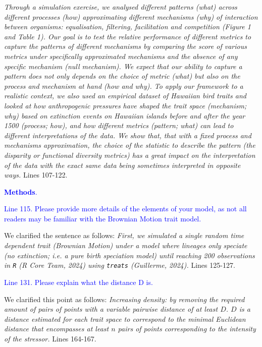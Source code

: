 \documentclass[
]{article}
\begin{document}
\textit{Through a simulation exercise, we analysed different patterns (what) across different processes (how) approximating different mechanisms (why) of interaction between organisms: equalisation, filtering, facilitation and competition (Figure 1 and Table 1).
Our goal is to test the relative performance of different metrics to capture the patterns of different mechanisms by comparing the score of various metrics under specifically approximated mechanisms and the absence of any specific mechanism (null mechanism).
We expect that our ability to capture a pattern does not only depends on the choice of metric (what) but also on the process and mechanism at hand (how and why).
To apply our framework to a realistic context, we also used an empirical dataset of Hawaiian bird traits and looked at how anthropogenic pressures have shaped the trait space (mechanism; why) based on extinction events on Hawaiian islands before and after the year 1500 (process; how), and how different metrics (pattern; what) can lead to different interpretations of the data.
We show that, that with a fixed process and mechanisms approximation, the choice of the statistic to describe the pattern (the disparity or functional diversity metrics) has a great impact on the interpretation of the data with the exact same data being sometimes interpreted in opposite ways.}
Lines 107-122.

\textcolor{blue}{\textbf{Methods}.}

\textcolor{blue}{Line 115. Please provide more details of the elements of your model, as not all readers may be familiar with the Brownian Motion trait model.}

We clarified the sentence as follows:
\textit{First, we simulated a single random time dependent trait (Brownian Motion) under a model where lineages only speciate (no extinction; i.e. a pure birth speciation model) until reaching 200 observations in \texttt{R} (R Core Team, 2024) using \texttt{treats} (Guillerme, 2024).}
Lines 125-127.

\textcolor{blue}{Line 131. Please explain what the distance D is.}

We clarified this point as follows:
\textit{Increasing density: by removing the required amount of pairs of points with a variable pairwise distance of at least $D$.
$D$ is a distance estimated for each trait space to correspond to the minimal Euclidean distance that encompasses at least $n$ pairs of points corresponding to the intensity of the stressor.}
Lines 164-167.
\end{document}
